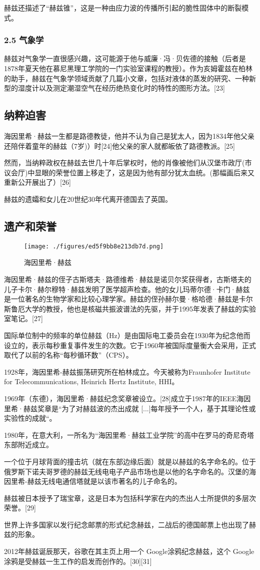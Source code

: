 赫兹还描述了“赫兹锥”，这是一种由应力波的传播所引起的脆性固体中的断裂模式。

\subsubsection{2.5 气象学}
赫兹对气象学一直很感兴趣，这可能源于他与威廉·冯·贝佐德的接触（后者是1878年夏天他在慕尼黑理工学院的一门实验室课程的教授）。作为亥姆霍兹在柏林的助手，赫兹在气象学领域贡献了几篇小文章，包括对液体的蒸发的研究、一种新型的湿度计以及测定潮湿空气在经历绝热变化时的特性的图形方法。[23]

\subsection{纳粹迫害}
海因里希·赫兹一生都是路德教徒，他并不认为自己是犹太人，因为1834年他父亲还陪伴着童年的赫兹（7岁)）时[24]他父亲的家人就都皈依了路德教派。[25]

然而，当纳粹政权在赫兹去世几十年后掌权时，他的肖像被他们从汉堡市政厅(市议会厅)中显眼的荣誉位置上移走了，这是因为他有部分犹太血统。(那幅画后来又重新公开展出了）[26]

赫兹的遗孀和女儿在20世纪30年代离开德国去了英国。

\subsection{遗产和荣誉}
\begin{figure}[ht]
\centering
\texttt{[image: ./figures/ed5f9bb8e213db7d.png]}
\caption{海因里希·赫兹} \label{fig_Hertz_10}
\end{figure}
海因里希·赫兹的侄子古斯塔夫·路德维希·赫兹是诺贝尔奖获得者，古斯塔夫的儿子卡尔·赫尔穆特·赫兹发明了医学超声检查。他的女儿玛蒂尔德·卡门·赫兹是一位著名的生物学家和比较心理学家。赫兹的侄孙赫尔曼·格哈德·赫兹是卡尔斯鲁厄大学的教授，他也是核磁共振波谱法的先驱，并于1995年发表了赫兹的实验室笔记。[27]

国际单位制中的频率的单位赫兹（Hz）是由国际电工委员会在1930年为纪念他而设立的，表示每秒重复事件发生的次数。它于1960年被国际度量衡大会采用，正式取代了以前的名称“每秒循环数”（CPS）。

1928年，海因里希-赫兹振荡研究所在柏林成立。今天被称为Fraunhofer Institute for Telecommunications, Heinrich Hertz Institute, HHI。

1969年（东德），海因里希·赫兹纪念奖章被设立。[28]成立于1987年的IEEE海因里希·赫兹奖章是“为了对赫兹波的杰出成就 [...]每年授予一个人，基于其理论性或实验性的成就“。

1980年，在意大利，一所名为“海因里希·赫兹工业学院”的高中在罗马的奇尼奇塔东部附近成立。

一个位于月球背面的撞击坑（就在东部边缘后面）就是以赫兹的名字命名的。位于俄罗斯下诺夫哥罗德的赫兹无线电电子产品市场也是以他的名字命名的。汉堡的海因里希-赫兹无线电通信塔就是以该市著名的儿子命名的。

赫兹被日本授予了瑞宝章，这是日本为包括科学家在内的杰出人士所提供的多层次荣誉。[29]

世界上许多国家以发行纪念邮票的形式纪念赫兹，二战后的德国邮票上也出现了赫兹的形象。

2012年赫兹诞辰那天，谷歌在其主页上用一个 Google涂鸦纪念赫兹，这个 Google涂鸦是受赫兹一生工作的启发而创作的。[30][31]